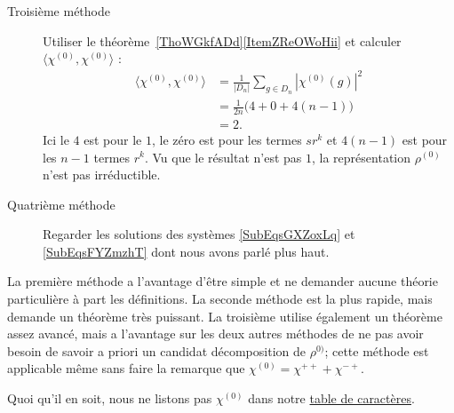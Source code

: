 \begin{enumerate}
\begin{description}
    \item[Troisième méthode]
        Utiliser le théorème~\ref{ThoWGkfADd}\ref{ItemZReOWoHii} et calculer \( \langle \chi^{(0)}, \chi^{(0)}\rangle \) :
        \begin{subequations}
            \begin{align}
                \langle \chi^{(0)}, \chi^{(0)}\rangle &=\frac{1}{ | D_n | }\sum_{g\in D_n}| \chi^{(0)}(g) |^2\\
                &=\frac{1}{ 2n }\big(4+0+4(n-1)\big)\\
                &=2.
            \end{align}
        \end{subequations}
        Ici le \( 4\) est pour le \( 1\), le zéro est pour les termes \( sr^k\) et \( 4(n-1)\) est pour les \( n-1\) termes \( r^k\). Vu que le résultat n'est pas \( 1\), la représentation \( \rho^{(0)}\) n'est pas irréductible.

    \item[Quatrième méthode]
        Regarder les solutions des systèmes \eqref{SubEqsGXZoxLq} et \eqref{SubEqsFYZmzhT} dont nous avons parlé plus haut.

    \end{description}

    La première méthode a l'avantage d'être simple et ne demander aucune théorie particulière à part les définitions. La seconde méthode est la plus rapide, mais demande un théorème très puissant. La troisième utilise également un théorème assez avancé, mais a l'avantage sur les deux autres méthodes de ne pas avoir besoin de savoir a priori un candidat décomposition de \( \rho^{0)}\); cette méthode est applicable même sans faire la remarque que \( \chi^{(0)}=\chi^{++}+\chi^{-+}\).

    Quoi qu'il en soit, nous ne listons pas \( \chi^{(0)}\) dans notre \href{http://fr.wikipedia.org/wiki/Aide:Unicode}{table de caractères}.


\end{enumerate}
